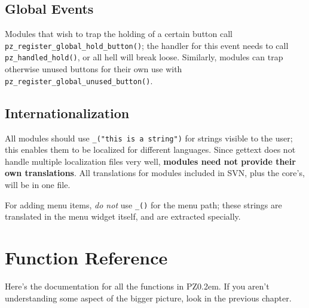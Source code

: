 \documentclass[12pt,letterpaper]{report}
\def\pz{{\footnotesize PZ}}
\def\pzt{\pz\kern0.2em{\large\oldstyle2}}
\begin{document}
\section{Global Events}
Modules that wish to trap the holding of a certain button call \verb|pz_register_|\hskip0pt\verb|global_hold_button()|;
the handler for this event needs to call \verb|pz_handled_|\hskip0pt\verb|hold()|, or all hell will break loose. Similarly, modules can trap
otherwise unused buttons for their own use with \verb|pz_register_global_unused_button()|.

\section{Internationalization}
All modules should use \verb|_("this is a string")| for strings visible to the user; this
enables them to be localized for different languages. Since gettext does not handle
multiple localization files very well, {\bf modules need not provide their own translations}.
All translations for modules included in SVN, plus the core's, will be in one file.

For adding menu items, {\it do not} use \verb|_()| for the menu path; these strings are
translated in the menu widget itself, and are extracted specially.

\chapter{Function Reference}
Here's the documentation for all the functions in \pzt. If you aren't understanding
some aspect of the bigger picture, look in the previous chapter.
\end{document}
